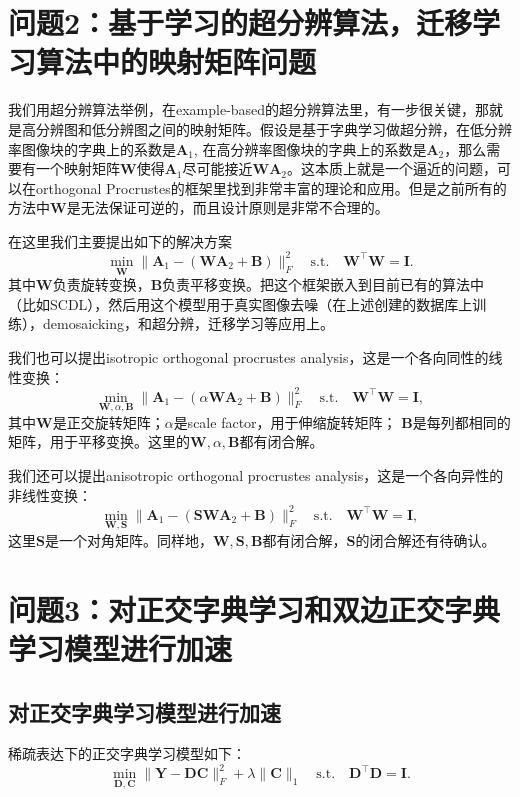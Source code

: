 \documentclass[10pt,twocolumn,letterpaper]{article}
\begin{document}
\section{问题2：基于学习的超分辨算法，迁移学习算法中的映射矩阵问题}
我们用超分辨算法举例，在example-based的超分辨算法里，有一步很关键，那就是高分辨图和低分辨图之间的映射矩阵。假设是基于字典学习做超分辨，在低分辨率图像块的字典上的系数是$\bm{A}_{1}$, 在高分辨率图像块的字典上的系数是$\bm{A}_{2}$，那么需要有一个映射矩阵$\bm{W}$使得$\bm{A}_{1}$尽可能接近$\bm{W}\bm{A}_{2}$。这本质上就是一个逼近的问题，可以在orthogonal Procrustes的框架里找到非常丰富的理论和应用。但是之前所有的方法中$\bm{W}$是无法保证可逆的，而且设计原则是非常不合理的。



在这里我们主要提出如下的解决方案
\begin{equation}
\min_{\bm{W}}\|\bm{A}_{1}-(\bm{W}\bm{A}_{2}+\bm{B})\|_{F}^{2}
\quad
\text{s.t.}
\quad
\bm{W}^{\top}\bm{W}=\bm{I}.
\end{equation}
其中$\bm{W}$负责旋转变换，$\bm{B}$负责平移变换。把这个框架嵌入到目前已有的算法中（比如SCDL），然后用这个模型用于真实图像去噪（在上述创建的数据库上训练），demosaicking，和超分辨，迁移学习等应用上。

我们也可以提出isotropic orthogonal procrustes analysis，这是一个各向同性的线性变换：
\begin{equation}
\min_{\bm{W}, \alpha, \bm{B}}\|\bm{A}_{1}-(\alpha\bm{W}\bm{A}_{2}+\bm{B})\|_{F}^{2}
\quad
\text{s.t.}
\quad
\bm{W}^{\top}\bm{W}=\bm{I},
\end{equation}
其中$\bm{W}$是正交旋转矩阵；$\alpha$是scale factor，用于伸缩旋转矩阵； $\bm{B}$是每列都相同的矩阵，用于平移变换。这里的$\bm{W}, \alpha, \bm{B}$都有闭合解。

我们还可以提出anisotropic orthogonal procrustes analysis，这是一个各向异性的非线性变换：
\begin{equation}
\min_{\bm{W}, \bm{S}}\|\bm{A}_{1}-(\bm{S}\bm{W}\bm{A}_{2}+\bm{B})\|_{F}^{2}
\quad
\text{s.t.}
\quad
\bm{W}^{\top}\bm{W}=\bm{I},
\end{equation}
这里$\bm{S}$是一个对角矩阵。同样地，$\bm{W},\bm{S},\bm{B}$都有闭合解，$\bm{S}$的闭合解还有待确认。




\section{问题3：对正交字典学习和双边正交字典学习模型进行加速}

\subsection{对正交字典学习模型进行加速}
稀疏表达下的正交字典学习模型如下：
\begin{equation}\label{equ5}
\min_{\bm{D},\bm{C}}\|\bm{Y}-\bm{D}\bm{C}\|_{F}^{2}
+
\lambda\|\bm{C}\|_{1}
\quad
\text{s.t.}
\quad
\bm{D}^{\top}\bm{D} =\bm{I}. 
\end{equation}
\end{document}
